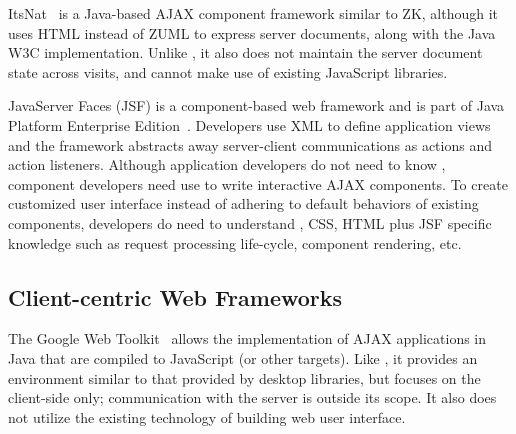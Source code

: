ItsNat~\cite{JoseMariaArranzSantamariaItsNat} is a Java-based AJAX
component framework similar to ZK, although it uses HTML instead of
ZUML to express server documents, along with the Java W3C implementation.  
Unlike \projectname, it also does not maintain the server document 
state across visits, and cannot make use of existing JavaScript libraries.

JavaServer Faces (JSF) is a component-based web framework and is part of
Java Platform Enterprise Edition~\cite{j2eedoc}.
Developers use XML to define application views and the framework abstracts
away server-client communications as actions and action listeners.
Although application developers do not need to know \js, component
developers need use \js to write interactive AJAX components.
To create customized user interface instead of adhering to 
default behaviors of existing components,
developers do need to understand \js, CSS, HTML plus JSF specific knowledge
such as request processing life-cycle, component rendering, etc.






\subsection{Client-centric Web Frameworks}

The Google Web Toolkit~\cite{GWT} allows the implementation of
AJAX applications in Java that are compiled to JavaScript (or other
targets).  Like \projectname, it provides an environment similar to 
that provided by desktop libraries, but focuses on the client-side only; 
communication with the server is outside its scope.
It also does not utilize the existing technology of building web user interface.



